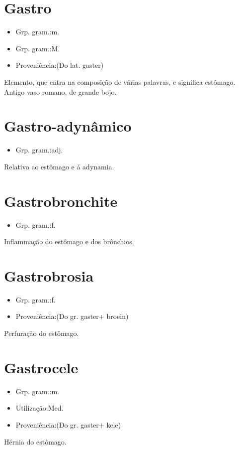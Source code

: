 \section{Gastro}
\begin{itemize}
\item {Grp. gram.:m.}
\end{itemize}
\begin{itemize}
\item {Grp. gram.:M.}
\end{itemize}
\begin{itemize}
\item {Proveniência:(Do lat. \textunderscore gaster\textunderscore )}
\end{itemize}
Elemento, que entra na composição de várias palavras, e significa \textunderscore estômago\textunderscore .
Antigo vaso romano, de grande bojo.
\section{Gastro-adynâmico}
\begin{itemize}
\item {Grp. gram.:adj.}
\end{itemize}
Relativo ao estômago e á adynamia.
\section{Gastrobronchite}
\begin{itemize}
\item {Grp. gram.:f.}
\end{itemize}
Inflammação do estômago e dos brônchios.
\section{Gastrobrosia}
\begin{itemize}
\item {Grp. gram.:f.}
\end{itemize}
\begin{itemize}
\item {Proveniência:(Do gr. \textunderscore gaster\textunderscore  + \textunderscore broein\textunderscore )}
\end{itemize}
Perfuração do estômago.
\section{Gastrocele}
\begin{itemize}
\item {Grp. gram.:m.}
\end{itemize}
\begin{itemize}
\item {Utilização:Med.}
\end{itemize}
\begin{itemize}
\item {Proveniência:(Do gr. \textunderscore gaster\textunderscore  + \textunderscore kele\textunderscore )}
\end{itemize}
Hérnia do estômago.
